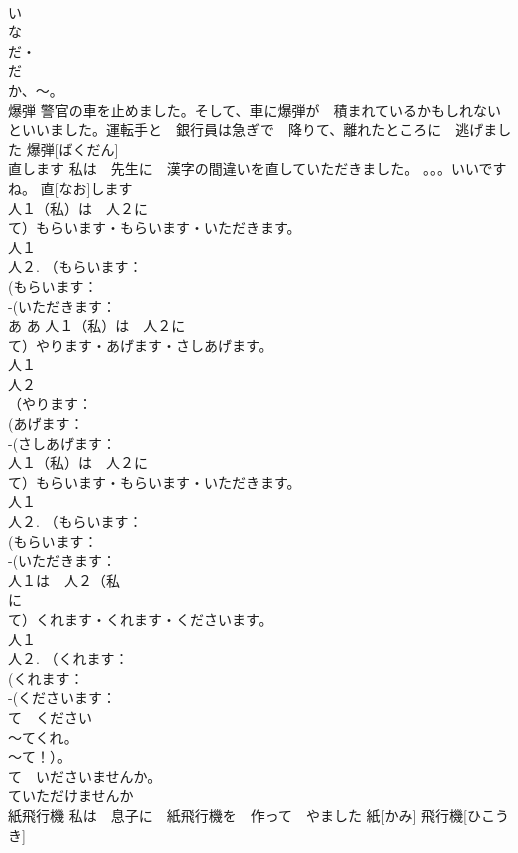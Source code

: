 \documentclass[8pt]{extreport}
\begin{document}
\begin{CJK}{UTF8}{min}
\\	い　
\\	な
\\	だ・
\\	だ 
\\	か、～。
\\	爆弾	警官の車を止めました。そして、車に爆弾が　積まれているかもしれないといいました。運転手と　銀行員は急ぎで　降りて、離れたところに　逃げました	爆弾[ばくだん]					
\\	直します	私は　先生に　漢字の間違いを直していただきました。 。。。いいですね。	直[なお]します			
\\	人１（私）は　人２に　
\\	て）もらいます・もらいます・いただきます。
\\	人１
\\	人２. （もらいます：
\\	(もらいます：
\\	-(いただきます：
\\	あ		あ				人１（私）は　人２に　
\\	て）やります・あげます・さしあげます。
\\	人１
\\	人２
\\	（やります：
\\	(あげます：
\\	-(さしあげます：
\\	人１（私）は　人２に　
\\	て）もらいます・もらいます・いただきます。
\\	人１
\\	人２. （もらいます：
\\	(もらいます：
\\	-(いただきます：
\\	人１は　人２（私
\\	に　
\\	て）くれます・くれます・くださいます。
\\	人１
\\	人２. （くれます：
\\	(くれます：
\\	-(くださいます：
\\	て　ください　
\\	～てくれ。
\\	～て！）。　
\\	て　いださいませんか。
\\	ていただけませんか 
\\	紙飛行機	私は　息子に　紙飛行機を　作って　やました	紙[かみ] 飛行機[ひこうき]			

\end{CJK}
\end{document}
